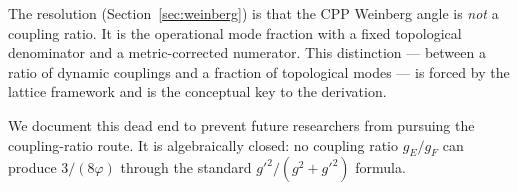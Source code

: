 \documentclass[11pt,letterpaper]{article}
\newcommand{\phig}{\varphi}
\begin{document}
The resolution (Section~\ref{sec:weinberg}) is that the CPP Weinberg angle is \emph{not} a coupling ratio. It is the operational mode fraction with a fixed topological denominator and a metric-corrected numerator. This distinction --- between a ratio of dynamic couplings and a fraction of topological modes --- is forced by the lattice framework and is the conceptual key to the derivation.

We document this dead end to prevent future researchers from pursuing the coupling-ratio route. It is algebraically closed: no coupling ratio $g_E/g_F$ can produce $3/(8\phig)$ through the standard $g'^2/(g^2+g'^2)$ formula.



\end{document}
